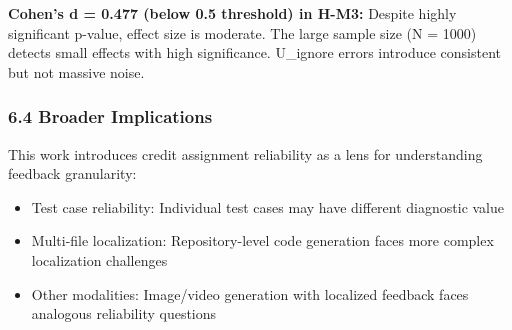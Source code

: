 \textbf{Cohen's d = 0.477 (below 0.5 threshold) in H-M3:} Despite highly significant p-value, effect size is moderate. The large sample size (N = 1000) detects small effects with high significance. U\_ignore errors introduce consistent but not massive noise.

\subsubsection{6.4 Broader Implications}

This work introduces credit assignment reliability as a lens for understanding feedback granularity:

\begin{itemize}
\item Test case reliability: Individual test cases may have different diagnostic value
\item Multi-file localization: Repository-level code generation faces more complex localization challenges
\item Other modalities: Image/video generation with localized feedback faces analogous reliability questions
\end{itemize}

